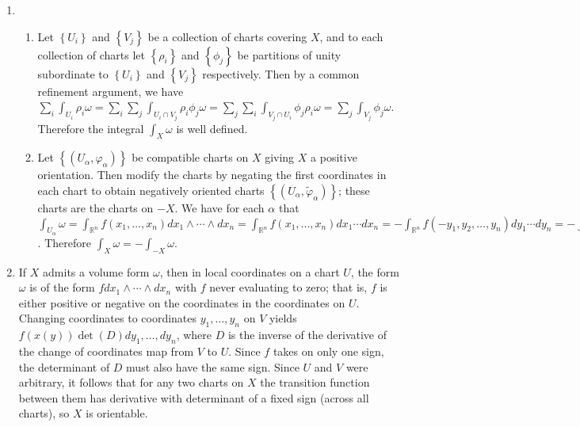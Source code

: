 \documentclass[11pt,leqno]{article}
\theoremstyle{plain}
\theoremstyle{definition}
\numberwithin{equation}{section}
\numberwithin{lem}{section}
\newcommand{\cbr}[1]{\left\{#1\right\}}
\begin{document}
\begin{enumerate}
    \item \begin{enumerate}
      \item Let $\cbr{U_i}$ and $\cbr{V_j}$ be a collection of charts covering $X$, and to each collection of charts let $\cbr{\rho_i}$ and $\cbr{\phi_j}$ be partitions of unity subordinate to $\cbr{U_i}$ and $\cbr{V_j}$ respectively. Then by a common refinement argument, we have $\sum_i\int_{U_i}\rho_i\omega = \sum_i\sum_j\int_{U_i\cap V_j}\rho_i\phi_j\omega = \sum_j\sum_i\int_{V_j\cap U_i}\phi_j\rho_i\omega = \sum_j\int_{V_j}\phi_j\omega$. Therefore the integral $\int_X\omega$ is well defined.
      \item Let $\cbr{(U_\alpha,\varphi_\alpha)}$ be compatible charts on $X$ giving $X$ a positive orientation. Then modify the charts by negating the first coordinates in each chart to obtain negatively oriented charts $\cbr{(U_\alpha,\tilde \varphi_\alpha)}$; these charts are the charts on $-X$. We have for each $\alpha$ that $\int_{U_\alpha}\omega = \int_{\mathbb R^n}f(x_1,\dots,x_n)dx_1\wedge\cdots\wedge dx_n = \int_{\mathbb R^n} f(x_1,\dots,x_n)dx_1\cdots dx_n = - \int_{\mathbb R^n} f(-y_1,y_2,\dots,y_n)dy_1\cdots dy_n = -\int_{U_\alpha} f(y_1,\dots,y_n)dy_1\wedge \cdots \wedge dy_n = -\int_{-U_\alpha}\omega$. Therefore $\int_X \omega = -\int_{-X}\omega$.
    \end{enumerate}
    \item If $X$ admits a volume form $\omega$, then in local coordinates on a chart $U$, the form $\omega$ is of the form $fdx_1\wedge \cdots\wedge dx_n$ with $f$ never evaluating to zero; that is, $f$ is either positive or negative on the coordinates in the coordinates on $U$. Changing coordinates to coordinates $y_1,\dots,y_n$ on $V$ yields $f(x(y))\det(D)dy_1,\dots,dy_n$, where $D$ is the inverse of the derivative of the change of coordinates map from $V$ to $U$. Since $f$ takes on only one sign, the determinant of $D$ must also have the same sign. Since $U$ and $V$ were arbitrary, it follows that for any two charts on $X$ the transition function between them has derivative with determinant of a fixed sign (across all charts), so $X$ is orientable. 
    

\end{enumerate}
\end{document}
